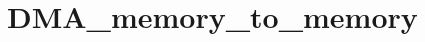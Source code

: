 \hypertarget{group___d_m_a__memory__to__memory}{\section{D\-M\-A\-\_\-memory\-\_\-to\-\_\-memory}
\label{group___d_m_a__memory__to__memory}
}
